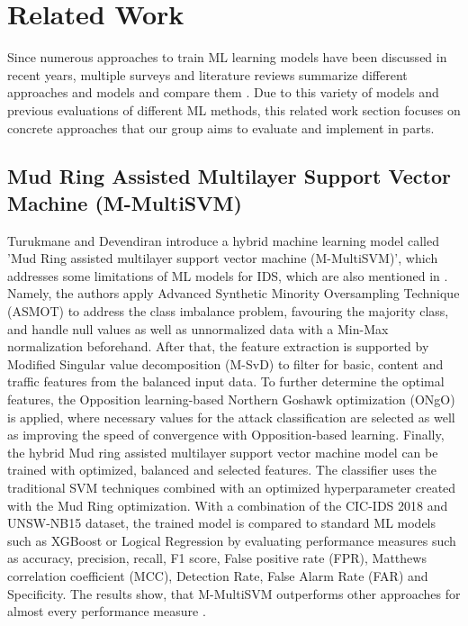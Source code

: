 \section{Related Work}
Since numerous approaches to train ML learning models have been discussed in recent years, multiple surveys and literature reviews summarize different approaches and models and compare them \cite{abdulganiyu2023systematic} \cite{al2021intrusion} \cite{saranya2020performance} \cite{sowmya2023comprehensive}. Due to this variety of models and previous evaluations of different ML methods, this related work section focuses on concrete approaches that our group aims to evaluate and implement in parts.

\subsection{Mud Ring Assisted Multilayer Support Vector Machine (M-MultiSVM)}
Turukmane and Devendiran \cite{SVM} introduce a hybrid machine learning model called 'Mud Ring
assisted multilayer support vector machine (M-MultiSVM)', which addresses some limitations of ML models for IDS, which are also mentioned in \cite{al2021intrusion}. Namely, the authors apply Advanced Synthetic Minority Oversampling Technique (ASMOT) to address the class imbalance problem, favouring the majority class, and handle null values as well as unnormalized data with a Min-Max normalization beforehand. After that, the feature extraction is supported by Modified Singular value decomposition (M-SvD) to filter for basic, content and traffic features from the balanced input data. To further determine the optimal features, the Opposition learning-based Northern Goshawk optimization (ONgO) is applied, where necessary values for the attack classification are selected as well as improving the speed of convergence with Opposition-based learning. Finally, the hybrid Mud ring assisted multilayer support vector machine model can be trained with optimized, balanced and selected features. The classifier uses the traditional SVM techniques combined with an optimized hyperparameter created with the Mud Ring optimization. With a combination of the CIC-IDS 2018 and UNSW-NB15 dataset, the trained model is compared to standard ML models such as XGBoost or Logical Regression by evaluating performance measures such as accuracy, precision, recall, F1 score, False positive rate (FPR), Matthews correlation coefficient (MCC), Detection Rate, False Alarm Rate (FAR) and Specificity. The results show, that M-MultiSVM outperforms other approaches for almost every performance measure \cite{SVM}.


